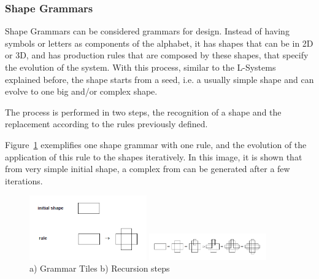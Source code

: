 
\subsubsection{Shape Grammars} %
\label{ssub:shape_grammars}


Shape Grammars can be considered grammars for design. Instead of having symbols or letters as components of the alphabet, it has shapes that can be in 2D or 3D, and has production rules that are composed by these shapes, that specify the evolution of the system. With this process, similar to the L-Systems explained before, the shape starts from a seed, i.e. a usually simple shape and can evolve to one big and/or complex shape.

The process is performed in two steps, the recognition of a shape and the replacement according to the rules previously defined. 

Figure~\ref{fig:SGrammars} exemplifies one shape grammar with one rule, and the evolution of the application of this rule to the shapes iteratively. In this image, it is shown that from very simple initial shape, a complex from can be generated after a few iterations.

\begin{figure}
        \centering
			\includegraphics[width=0.45\textwidth]{img/Theory/Shape_Grammars/Grammar.png}
        
			\includegraphics[width=0.45\textwidth]{img/Theory/Shape_Grammars/Recursion.png}
        \caption{a) Grammar Tiles b) Recursion steps}
        \label{fig:SGrammars}
\end{figure}

